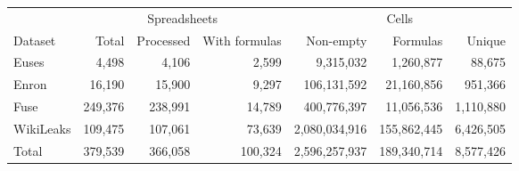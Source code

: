 \begin{tabular}{l|rrr|rrr}
\toprule
 & \multicolumn{3}{|c|}{Spreadsheets}   &  \multicolumn{3}{|c}{Cells}   \\
Dataset & Total & Processed & With formulas & Non-empty & Formulas & Unique \\
\midrule
Euses & 4,498   & 4,106     & 2,599  & 9,315,032    & 1,260,877  & 88,675 \\
Enron & 16,190  & 15,900    & 9,297  & 106,131,592  & 21,160,856 & 951,366 \\
Fuse  & 249,376 & 238,991   & 14,789 & 400,776,397  & 11,056,536 & 1,110,880 \\
WikiLeaks   & 109,475 & 107,061   & 73,639 & 2,080,034,916& 155,862,445& 6,426,505 \\
\midrule
Total & 379,539	& 366,058 	& 100,324& 2,596,257,937& 189,340,714& 8,577,426\\
\bottomrule
\end{tabular}